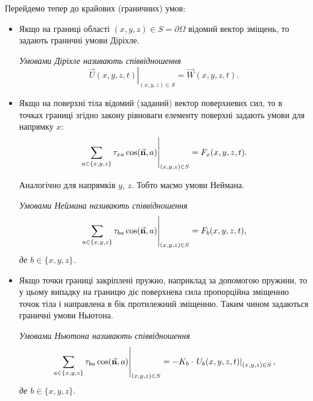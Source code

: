 Перейдемо тепер до крайових (граничних) умов:
\begin{itemize}
	\item Якщо на границі області $(x, y, z) \in S = \partial \Omega$ відомий вектор зміщень, то задають граничні умови Діріхле.

	\begin{definition}
		\it{Умовами Діріхле} називають співвідношення
		\begin{equation}
			\left. \vec U(x, y, z, t) \right|_{(x, y, z) \in S} = \vec W(x, y, z, t).
		\end{equation}
	\end{definition}

	\item Якщо на поверхні тіла відомий (заданий) вектор поверхневих сил, то в точках границі згідно закону рівноваги елементу поверхні задають умови для напрямку $x$:
	\begin{equation}
		\left. \displaystyle\sum\limits_{a \in \{x, y, z\}} \tau_{x a}\cos(\vec{\textbf{n}}, a) \right|_{(x, y, z) \in S} = F_x(x, y, z, t).
	\end{equation}

	Аналогічно для напрямків $y$, $z$. Тобто маємо умови Неймана.

	\begin{definition}
		\it{Умовами Неймана} називають співвідношення
		\begin{equation}
			\left. \displaystyle\sum\limits_{a \in \{x, y, z\}} \tau_{b a} \cos(\vec{\textbf{n}}, a) \right|_{(x, y, z) \in S} = F_b(x, y, z, t),
		\end{equation}
		 де $b \in \{x, y, z\}$.
	\end{definition}

	\item Якщо точки границі закріплені пружно, наприклад за допомогою пружини, то у цьому випадку на границю діє поверхнева сила пропорційна зміщенню точок тіла і направлена в бік протилежний зміщенню. Таким чином задаються граничні умови Ньютона.

	\begin{definition}
		\it{Умовами Ньютона} називають співвідношення
		\begin{equation}
			\left. \displaystyle\sum\limits_{a \in \{x, y, z\}} \tau_{b a} \cos(\vec{\textbf{n}}, a) \right|_{(x, y, z) \in S} = - K_b \cdot \left. U_b(x, y, z, t) \right|_{(x, y, z) \in S},
		\end{equation}
		де $b \in \{x, y, z\}$.
	\end{definition}


\end{itemize}
